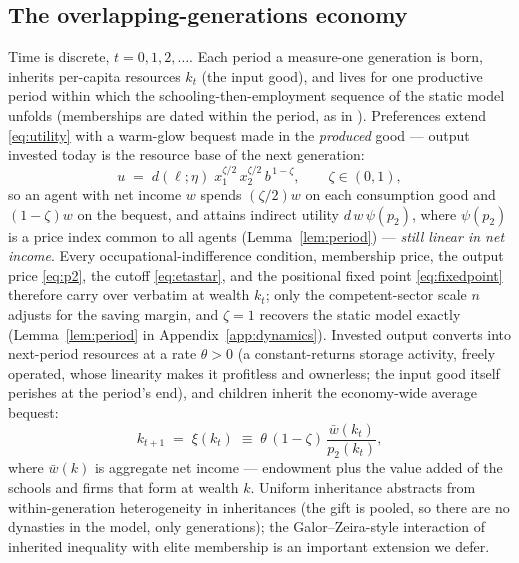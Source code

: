 \documentclass[12pt,letterpaper]{article}
\theoremstyle{definition}
\begin{document}
\subsection{The overlapping-generations economy}

Time is discrete, $t=0,1,2,\dots$.
Each period a measure-one generation is born, inherits per-capita resources $k_t$ (the input good), and lives for one productive period within which the schooling-then-employment sequence of the static model unfolds (memberships are dated within the period, as in \citealt{ellickson2006organization}).
Preferences extend \eqref{eq:utility} with a warm-glow bequest made in the \emph{produced} good --- output invested today is the resource base of the next generation:
\begin{equation}\label{eq:olg-utility}
  u \;=\; d(\ell;\eta)\; x_1^{\zeta/2}\, x_2^{\zeta/2}\, b^{\,1-\zeta},
  \qquad \zeta\in(0,1),
\end{equation}
so an agent with net income $w$ spends $(\zeta/2)w$ on each consumption good and $(1-\zeta)w$ on the bequest, and attains indirect utility $d\,w\,\psi(p_2)$, where $\psi(p_2)$ is a price index common to all agents (Lemma~\ref{lem:period}) --- \emph{still linear in net income}.
Every occupational-indifference condition, membership price, the output price \eqref{eq:p2}, the cutoff \eqref{eq:etastar}, and the positional fixed point \eqref{eq:fixedpoint} therefore carry over verbatim at wealth $k_t$; only the competent-sector scale $n$ adjusts for the saving margin, and $\zeta=1$ recovers the static model exactly (Lemma~\ref{lem:period} in Appendix~\ref{app:dynamics}).
Invested output converts into next-period resources at a rate $\theta>0$ (a constant-returns storage activity, freely operated, whose linearity makes it profitless and ownerless; the input good itself perishes at the period's end), and children inherit the economy-wide average bequest:
\begin{equation}\label{eq:transition}
  k_{t+1} \;=\; \xi(k_t) \;\equiv\; \theta\,(1-\zeta)\,\frac{\bar{w}(k_t)}{p_2(k_t)},
\end{equation}
where $\bar{w}(k)$ is aggregate net income --- endowment plus the value added of the schools and firms that form at wealth $k$.
Uniform inheritance abstracts from within-generation heterogeneity in inheritances (the gift is pooled, so there are no dynasties in the model, only generations); the Galor--Zeira-style interaction of inherited inequality with elite membership is an important extension we defer.
\end{document}
